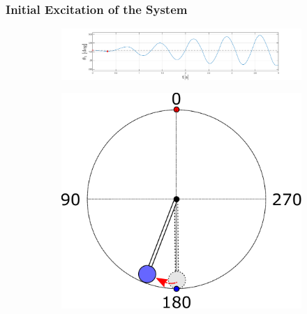 \documentclass[]{beamer}
\begin{document}
\begin{frame}
	\frametitle{Initial Excitation of the System}
	\begin{figure}[H]
		\centering
		\begin{subfigure}
			\centering
			\includegraphics[scale=0.25]{images/swings2/swing2.pdf}  
		\end{subfigure}
		\begin{subfigure}
			\centering
			\includegraphics[scale=0.25]{images/swing1.pdf}  
		\end{subfigure}
	\end{figure}
\end{frame}
\end{document}

